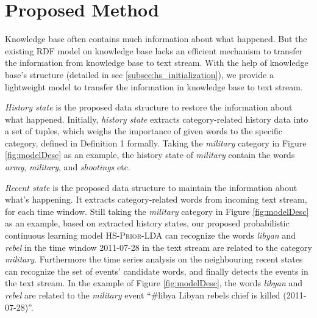 \documentclass{article}
\begin{document}

\section{Proposed Method}
Knowledge base often contains much information about what happened. 
But the existing RDF model\cite{klyne2006rdf} on knowledge base lacks an efficient mechanism to transfer the information from knowledge base to text stream.  
With the help of knowledge base's structure (detailed in sec \ref{subsec:hs_initialization}), we provide a  lightweight model to transfer the information in knowledge base to text stream.

\textit{History state} is the proposed data structure to restore the information about what happened. 
Initially, \textit{history state} extracts category-related history data into a set of tuples, which weighs the importance of given words to the specific category, defined in Definition 1 formally. 
Taking the \textit{military} category in Figure \ref{fig:modelDesc} as an example, the history state of \textit{military} contain the words \textit{army}, \textit{military}, and \textit{shootings} etc. 

\textit{Recent state} is the proposed data structure to maintain the information about what's happening.
It extracts category-related words from incoming text stream, for each time window.
Still taking the \textit{military} category in  Figure \ref{fig:modelDesc} as an example, based on extracted history states, our proposed probabilistic continuous learning model \textsc{HS-Prior-LDA} can recognize the words \textit{libyan} and \textit{rebel} in the time window 2011-07-28 in the text stream are related to the category \textit{military}. 
Furthermore the time series analysis on the neighbouring recent states can recognize the set of events' candidate words, and finally detects the events in the text stream. 
In the example of Figure \ref{fig:modelDesc}, the words \textit{libyan} and \textit{rebel} are related to the \textit{military} event ``\#libya Libyan rebels chief is killed (2011-07-28)''.
\end{document}
